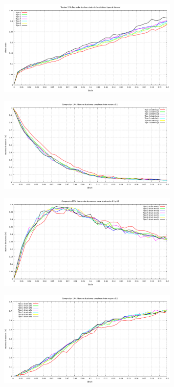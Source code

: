 \documentclass[10pt, oneside]{article} %
\begin{document}
\begin{figure}[H]
\centering
\includegraphics[width=9cm]{Figures/Porosidad_ss_8.png}
\caption{}
\end{figure}

\begin{figure}[H]
\centering
\includegraphics[width=9cm]{Figures/Porosidad_ss_9.png}
\caption{}
\end{figure}

\begin{figure}[H]
\centering
\includegraphics[width=9cm]{Figures/Porosidad_ss_10.png}
\caption{}
\end{figure}

\begin{figure}[H]
\centering
\includegraphics[width=9cm]{Figures/Porosidad_ss_11.png}
\caption{}
\end{figure}
\end{document}
